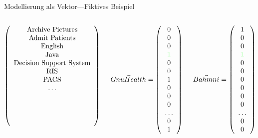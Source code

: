 \documentclass[aspectratio=1610]{beamer}
\newcommand{\both}[1]{{\color[rgb]{0.8,1,0.8}\textbf{#1}}}
\begin{document}
\begin{frame}{Modellierung als Vektor---Fiktives Beispiel}

\begin{columns}
 
 \begin{column}{.4\textwidth}
   \[\left(\begin{array}{c} \textnormal{Archive Pictures} \\ \textnormal{Admit Patients} \\ \textnormal{English} \\ \textnormal{Java} \\ \textnormal{Decision Support System} \\ \textnormal{RIS} \\ \textnormal{PACS} \\ \dots \\ \\ \\ \\ \\ \end{array}\right) \]
 \end{column}
 
 \begin{column}{.25\textwidth}
   \[\vec{GnuHealth}	= \left(\begin{array}{c} 0 \\ 0 \\ 0 \\ \both{1} \\ 0 \\ 0 \\ 1 \\ 0 \\ 0 \\ 0 \\ \ldots \\ 0 \\ 1 \end{array}\right) \]
 \end{column}

 \begin{column}{.25\textwidth}
   \[\vec{Bahmni}		= \left(\begin{array}{c} 1 \\ 0 \\ 0 \\ \both{1} \\ 0 \\ 0 \\ 0 \\ 0 \\ 0 \\ 0 \\ \ldots \\ 0 \\ 0 \end{array}\right) \]
 \end{column}
\end{columns}

\end{frame}
\end{document}
